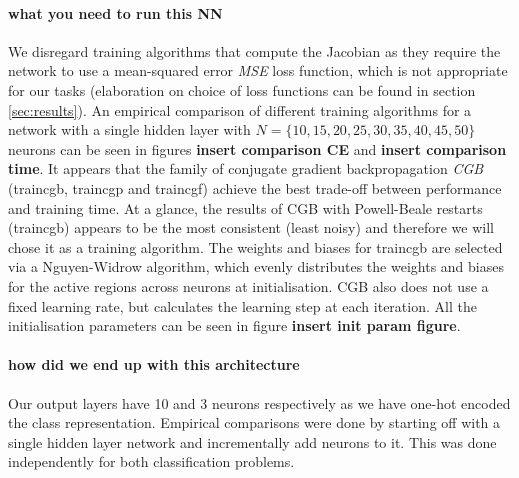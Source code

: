 \documentclass[11pt,a4paper]{article}
\begin{document}
\paragraph{what you need to run this NN}
We disregard training algorithms that compute the Jacobian as they require the network to use a mean-squared error \textit{MSE} loss function, which is not appropriate for our tasks (elaboration on choice of loss functions can be found in section \ref{sec:results}). An empirical comparison of different training algorithms for a network with a single hidden layer with \(N = \{10,15,20,25,30,35,40,45,50\}\) neurons can be seen in figures \textbf{insert comparison CE} and \textbf{insert comparison time}. It appears that the family of conjugate gradient backpropagation \textit{CGB} (traincgb, traincgp and traincgf) achieve the best trade-off between performance and training time. At a glance, the results of CGB with Powell-Beale restarts (traincgb) appears to be the most consistent (least noisy) and therefore we will chose it as a training algorithm. The weights and biases for traincgb are selected via a Nguyen-Widrow \autocite{NetParamInit} algorithm, which evenly distributes the weights and biases for the active regions across neurons at initialisation. CGB also does not use a fixed learning rate, but calculates the learning step at each iteration. All the initialisation parameters can be seen in figure \textbf{insert init param figure}.

% 

\paragraph{how did we end up with this architecture}
Our output layers have 10 and 3 neurons respectively as we have one-hot encoded the class representation.
Empirical comparisons were done by starting off with a single hidden layer network and incrementally add neurons to it. This was done independently for both classification problems. 



\end{document}
